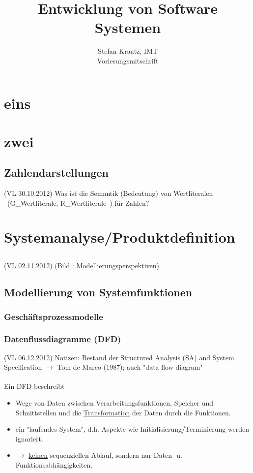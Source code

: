 \documentclass[10pt,a4paper]{book}
\author{Stefan Kraatz, IMT\\Vorlesungsmitschrift}
\title{Entwicklung von Software Systemen}
\begin{document}
\maketitle
\chapter{eins}
\chapter{zwei}
\section{}
\section{}
\section{Zahlendarstellungen}
(VL 30.10.2012) Was ist die Semantik (Bedeutung) von Wertliteralen \ (G\_Wertliterale, R\_Wertliterale\ ) für Zahlen?
\chapter{Systemanalyse/Produktdefinition}
\section{}
(VL 02.11.2012) (Bild : Modellierungsperspektiven) 
\section{Modellierung von Systemfunktionen}
\subsection{Geschäftsprozessmodelle}
\subsection{Datenflussdiagramme (DFD)}
(VL 06.12.2012)
Notizen: Bestand der Structured Analysis (SA) and System Specification $\rightarrow$ Tom de Marco (1987); auch "data flow diagram"
\\
\\
Ein DFD beschreibt
\begin{itemize}
  \item Wege von Daten zwischen Verarbeitungsfunktionen, Speicher und Schnittstellen und die \underline{Transformation} der Daten durch die Funktionen.
  \item ein "laufendes System", d.h. Aspekte wie Initialisierung/Terminierung werden ignoriert.
  \item $\rightarrow$ \underline{keinen} sequenziellen Ablauf, sondern nur Daten- u. Funktionsabhängigkeiten.
\end{itemize}
\end{document}
